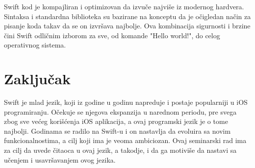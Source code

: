 \documentclass[a4paper]{article}
\begin{document}
Swift kod je kompajliran i optimizovan da izvuče najviše iz modernog hardvera. Sintaksa i standardna biblioteka su bazirane na konceptu da je očigledan način za pisanje koda takav da se on izvršava najbolje. Ova kombinacija sigurnosti i brzine čini Swift odličnim izborom za sve, od komande "Hello world!", do celog operativnog sistema.

\section{Zaključak}
\label{sec:zakljucak}
Swift je mlad jezik, koji iz godine u godinu napreduje i postaje popularniji u iOS programiranju. Očekuje se njegova ekspanzija u narednom periodu, pre svega zbog sve većeg korišćenja iOS aplikacija, a ovaj programski jezik je o tome najbolji. Godinama se radilo na Swift-u i on nastavlja da evoluira sa novim funkcionalnostima, a cilj koji ima je veoma ambiciozan. Ovaj seminarski rad ima za cilj da uvede čitaoca u ovaj jezik, a takodje, i da ga motiviše da nastavi sa učenjem i usavršavanjem ovog jezika. 


\appendix
 
\end{document}
